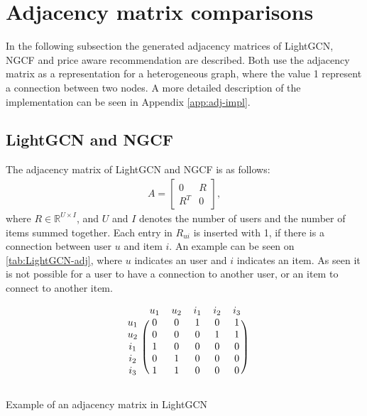 \section{Adjacency matrix comparisons}
In the following subsection the generated adjacency matrices of LightGCN, NGCF and price aware recommendation are described.
Both use the adjacency matrix as a representation for a heterogeneous graph, where the value 1 represent a connection between two nodes.
A more detailed description of the implementation can be seen in Appendix \ref{app:adj-impl}.

\subsection{LightGCN and NGCF}
The adjacency matrix of LightGCN and NGCF is as follows:
\begin{gather}
    A =
    \begin{bmatrix}
        0   & R \\
        R^T & 0
    \end{bmatrix},
\end{gather}
where $R \in \mathbb{R}^{U \times I}$, and $U$ and $I$ denotes the number of users and the number of items summed together.
Each entry in $R_{ui}$ is inserted with 1, if there is a connection between user $u$ and item $i$.
An example can be seen on \autoref{tab:LightGCN-adj}, where $u$ indicates an user and $i$ indicates an item.
As seen it is not possible for a user to have a connection to another user, or an item to connect to another item.
\begin{table}

    \[
        \begin{blockarray}{cccccc}
            & u_1 & u_2 & i_1 & i_2 & i_3 \\
            \begin{block}{c(ccccc)}
                u_1 & 0 & 0 & 1 & 0 & 1   \\
                u_2 & 0 & 0 & 0 & 1 & 1   \\
                i_1 & 1 & 0 & 0 & 0 & 0   \\
                i_2 & 0 & 1 & 0 & 0 & 0   \\
                i_3 & 1 & 1 & 0 & 0 & 0   \\
            \end{block}
        \end{blockarray}
    \]
    \caption{Example of an adjacency matrix in LightGCN}
    \label{tab:LightGCN-adj}
\end{table}

